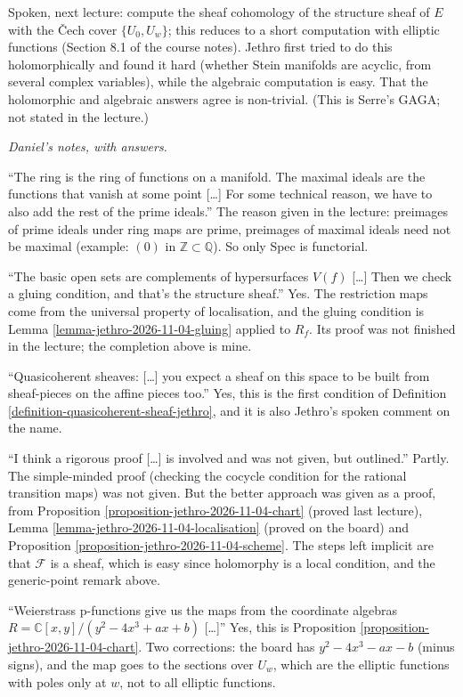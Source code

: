 Spoken, next lecture: compute the sheaf
cohomology of the structure sheaf of $E$ with
the \v{C}ech cover $\{U_0,U_w\}$; this
reduces to a short computation with elliptic
functions (Section 8.1 of the course notes).
Jethro first tried to do this holomorphically
and found it hard (whether Stein manifolds
are acyclic, from several complex variables),
while the algebraic computation is easy. That
the holomorphic and algebraic answers agree
is non-trivial. (This is Serre's GAGA; not
stated in the lecture.)

\textit{Daniel's notes, with answers.}

``The ring is the ring of functions on a
manifold. The maximal ideals are the
functions that vanish at some point [\ldots]
For some technical reason, we have to also
add the rest of the prime ideals.'' The
reason given in the lecture: preimages of
prime ideals under ring maps are prime,
preimages of maximal ideals need not be
maximal (example: $(0)$ in
$\mathbb{Z}\subset\mathbb{Q}$). So only Spec
is functorial.

``The basic open sets are complements of
hypersurfaces $V(f)$ [\ldots] Then we check a
gluing condition, and that's the structure
sheaf.'' Yes. The restriction maps come from
the universal property of localisation, and
the gluing condition is Lemma
\ref{lemma-jethro-2026-11-04-gluing} applied
to $R_f$. Its proof was not finished in the
lecture; the completion above is mine.

``Quasicoherent sheaves: [\ldots] you expect
a sheaf on this space to be built from
sheaf-pieces on the affine pieces too.'' Yes,
this is the first condition of Definition
\ref{definition-quasicoherent-sheaf-jethro},
and it is also Jethro's spoken comment on the
name.

``I think a rigorous proof [\ldots] is
involved and was not given, but outlined.''
Partly. The simple-minded proof (checking the
cocycle condition for the rational transition
maps) was not given. But the better approach
was given as a proof, from Proposition
\ref{proposition-jethro-2026-11-04-chart}
(proved last lecture), Lemma
\ref{lemma-jethro-2026-11-04-localisation}
(proved on the board) and Proposition
\ref{proposition-jethro-2026-11-04-scheme}.
The steps left implicit are that
$\mathcal{F}$ is a sheaf, which is easy since
holomorphy is a local condition, and the
generic-point remark above.

``Weierstrass p-functions give us the maps
from the coordinate algebras
$R=\mathbb{C}[x,y]/(y^2-4x^3+ax+b)$
[\ldots]'' Yes, this is Proposition
\ref{proposition-jethro-2026-11-04-chart}.
Two corrections: the board has
$y^2-4x^3-ax-b$ (minus signs), and the map
goes to the sections over $U_w$, which are
the elliptic functions with poles only at
$w$, not to all elliptic functions.

